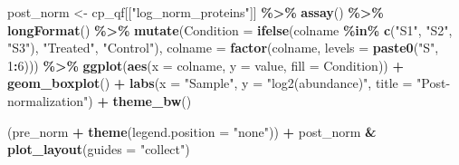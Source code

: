 \documentclass[9pt,a4paper,]{extarticle}
\newenvironment{Shaded}{\begin{snugshade}}{\end{snugshade}}
\newcommand{\AttributeTok}[1]{\textcolor[rgb]{0.13,0.29,0.53}{#1}}
\newcommand{\DecValTok}[1]{\textcolor[rgb]{0.00,0.00,0.81}{#1}}
\newcommand{\FunctionTok}[1]{\textcolor[rgb]{0.13,0.29,0.53}{\textbf{#1}}}
\newcommand{\NormalTok}[1]{#1}
\newcommand{\OtherTok}[1]{\textcolor[rgb]{0.56,0.35,0.01}{#1}}
\newcommand{\SpecialCharTok}[1]{\textcolor[rgb]{0.81,0.36,0.00}{\textbf{#1}}}
\newcommand{\StringTok}[1]{\textcolor[rgb]{0.31,0.60,0.02}{#1}}
\begin{document}
\begin{Shaded}
\begin{Highlighting}[]
\NormalTok{post\_norm }\OtherTok{\textless{}{-}}\NormalTok{ cp\_qf[[}\StringTok{"log\_norm\_proteins"}\NormalTok{]] }\SpecialCharTok{\%\textgreater{}\%}
  \FunctionTok{assay}\NormalTok{() }\SpecialCharTok{\%\textgreater{}\%}
  \FunctionTok{longFormat}\NormalTok{() }\SpecialCharTok{\%\textgreater{}\%}
  \FunctionTok{mutate}\NormalTok{(}\AttributeTok{Condition =} \FunctionTok{ifelse}\NormalTok{(colname }\SpecialCharTok{\%in\%} \FunctionTok{c}\NormalTok{(}\StringTok{"S1"}\NormalTok{, }\StringTok{"S2"}\NormalTok{, }\StringTok{"S3"}\NormalTok{),}
                            \StringTok{"Treated"}\NormalTok{, }\StringTok{"Control"}\NormalTok{),}
         \AttributeTok{colname =} \FunctionTok{factor}\NormalTok{(colname, }\AttributeTok{levels =} \FunctionTok{paste0}\NormalTok{(}\StringTok{"S"}\NormalTok{, }\DecValTok{1}\SpecialCharTok{:}\DecValTok{6}\NormalTok{))) }\SpecialCharTok{\%\textgreater{}\%}
  \FunctionTok{ggplot}\NormalTok{(}\FunctionTok{aes}\NormalTok{(}\AttributeTok{x =}\NormalTok{ colname, }\AttributeTok{y =}\NormalTok{ value, }\AttributeTok{fill =}\NormalTok{ Condition)) }\SpecialCharTok{+}
  \FunctionTok{geom\_boxplot}\NormalTok{() }\SpecialCharTok{+}
  \FunctionTok{labs}\NormalTok{(}\AttributeTok{x =} \StringTok{"Sample"}\NormalTok{, }\AttributeTok{y =} \StringTok{"log2(abundance)"}\NormalTok{, }\AttributeTok{title =} \StringTok{"Post{-}normalization"}\NormalTok{) }\SpecialCharTok{+}
  \FunctionTok{theme\_bw}\NormalTok{()}

\NormalTok{(pre\_norm }\SpecialCharTok{+} \FunctionTok{theme}\NormalTok{(}\AttributeTok{legend.position =} \StringTok{"none"}\NormalTok{)) }\SpecialCharTok{+} 
\NormalTok{  post\_norm }\SpecialCharTok{\&} \FunctionTok{plot\_layout}\NormalTok{(}\AttributeTok{guides =} \StringTok{"collect"}\NormalTok{)}
\end{Highlighting}
\end{Shaded}
\end{document}
